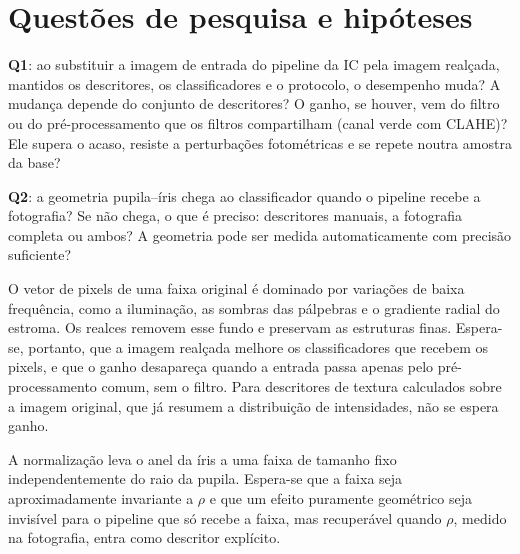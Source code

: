 \chapter{Questões de pesquisa e hipóteses}
\label{cap:questoes}


\begin{alineas}
  \item \textbf{Q1}: ao substituir a imagem de entrada do pipeline da IC pela
  imagem realçada, mantidos os descritores, os classificadores e o
  protocolo, o desempenho muda? A mudança depende do conjunto de
  descritores? O ganho, se houver, vem do filtro ou do pré-processamento que
  os filtros compartilham (canal verde com CLAHE)? Ele supera o acaso, resiste
  a perturbações fotométricas e se repete noutra amostra da base?
  \item \textbf{Q2}: a geometria pupila--íris chega ao classificador quando o
  pipeline recebe a fotografia? Se não chega, o que é preciso: descritores
  manuais, a fotografia completa ou ambos? A geometria pode ser medida
  automaticamente com precisão suficiente?
\end{alineas}


\begin{hipotese}\label{hip:realce}
O vetor de pixels de uma faixa original é dominado por variações de baixa
frequência, como a iluminação, as sombras das pálpebras e o gradiente radial
do estroma. Os realces removem esse fundo e preservam as estruturas finas.
Espera-se, portanto, que a imagem realçada melhore os classificadores que
recebem os pixels, e que o ganho desapareça quando a entrada passa apenas pelo
pré-processamento comum, sem o filtro. Para descritores de textura calculados
sobre a imagem original, que já resumem a distribuição de intensidades, não
se espera ganho.
\end{hipotese}

\begin{hipotese}\label{hip:geometria}
A normalização \rs{} leva o anel da íris a uma faixa de tamanho fixo
independentemente do raio da pupila. Espera-se que a faixa seja
aproximadamente invariante a $\rho$ e que um efeito puramente geométrico seja
invisível para o pipeline que só recebe a faixa, mas recuperável quando
$\rho$, medido na fotografia, entra como descritor explícito.
\end{hipotese}

